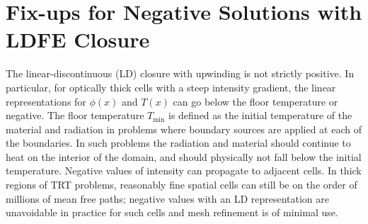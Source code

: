
\section{Fix-ups for Negative Solutions with LDFE Closure}
\label{sec:ldfe_fixups}

The linear-discontinuous (LD) closure with upwinding is not strictly positive.  In particular, for
optically thick cells with a steep intensity gradient, the linear representations for
$\phi(x)$ and $T(x)$ can go below the floor temperature or negative. 
The floor temperature $T_{\min}$ is defined as the initial
temperature of the material and radiation in problems where boundary sources are
applied at each of the boundaries.  In such problems the radiation and material should
continue to heat on the interior of the domain, and should physically not fall below
the initial temperature. 
Negative values of intensity can propagate to adjacent cells. In thick regions of
TRT problems, reasonably fine spatial cells can still be on the order of millions of mean
free paths; negative values with an LD representation are unavoidable in practice for
such cells and mesh refinement is of minimal use. 

